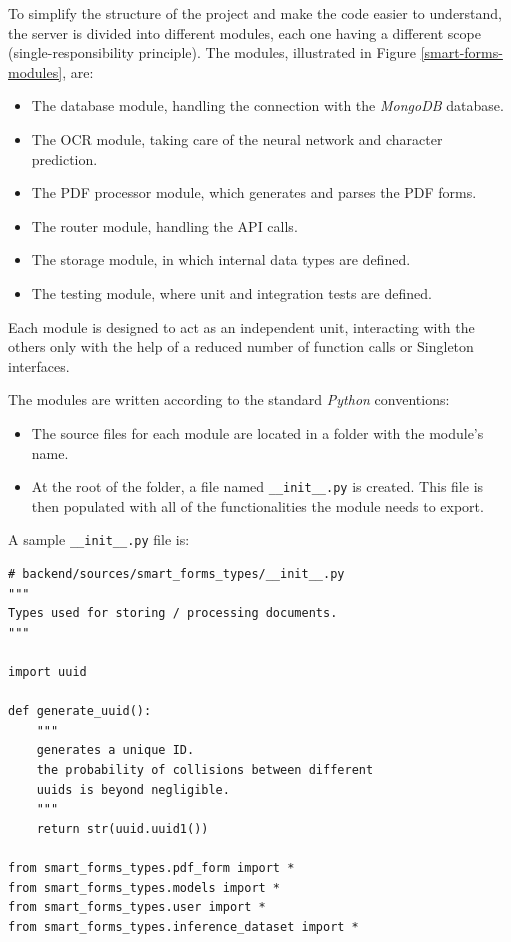 \documentclass[11pt, a4paper]{report}
\def\code#1{\texttt{#1}}
\begin{document}
To simplify the structure of the project and make the code easier to understand, the server is divided into different modules, each one having a different scope (single-responsibility principle). The modules, illustrated in Figure \ref{smart-forms-modules}, are:
\begin{itemize}
    \item The database module, handling the connection with the \textit{MongoDB} database.
    \item The OCR module, taking care of the neural network and character prediction.
    \item The PDF processor module, which generates and parses the PDF forms.
    \item The router module, handling the API calls.
    \item The storage module, in which internal data types are defined.
    \item The testing module, where unit and integration tests are defined.
\end{itemize}


Each module is designed to act as an independent unit, interacting with the others only with the help of a reduced number of function calls or Singleton interfaces.

The modules are written according to the standard \textit{Python} conventions:
\begin{itemize}
    \item The source files for each module are located in a folder with the module's name.
    \item At the root of the folder, a file named \code{\_\_init\_\_.py} is created. This file is then populated with all of the functionalities the module needs to export.
\end{itemize}

A sample \code{\_\_init\_\_.py} file is:

\begin{verbatim}
# backend/sources/smart_forms_types/__init__.py
"""
Types used for storing / processing documents.
"""

import uuid

def generate_uuid():
    """
    generates a unique ID.
    the probability of collisions between different
    uuids is beyond negligible.
    """
    return str(uuid.uuid1())

from smart_forms_types.pdf_form import *
from smart_forms_types.models import *
from smart_forms_types.user import *
from smart_forms_types.inference_dataset import *
\end{verbatim}
\end{document}
